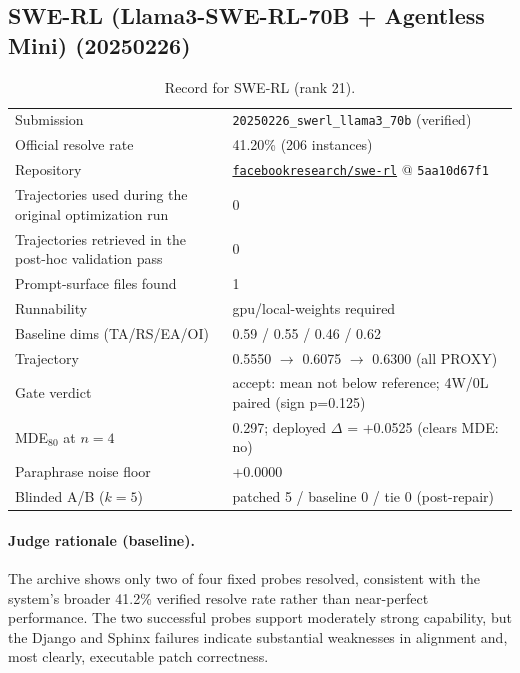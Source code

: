 \subsection{SWE-RL (Llama3-SWE-RL-70B + Agentless Mini) (20250226)}
\label{app:agent21}
\begin{table}[H]\centering\scriptsize
\caption{Record for SWE-RL (rank 21).}
\begin{tabular}{lp{8.2cm}}\toprule
Submission & \texttt{20250226\_\allowbreak{}swerl\_\allowbreak{}llama3\_\allowbreak{}70b} (verified) \\
Official resolve rate & 41.20\% (206 instances) \\
Repository & \href{https://github.com/facebookresearch/swe-rl}{\texttt{facebookresearch/swe-rl}} @ \texttt{5aa10d67f1} \\
Trajectories used during the original optimization run & 0 \\
Trajectories retrieved in the post-hoc validation pass & 0 \\
Prompt-surface files found & 1 \\
Runnability & gpu/local-weights required \\
Baseline dims (TA/RS/EA/OI) & 0.59 / 0.55 / 0.46 / 0.62 \\
Trajectory & 0.5550 $\to$ 0.6075 $\to$ 0.6300 (all PROXY) \\
Gate verdict & accept: mean not below reference; 4W/0L paired (sign p=0.125) \\
MDE$_{80}$ at $n{=}4$ & 0.297; deployed $\Delta$ = +0.0525 (clears MDE: no) \\
Paraphrase noise floor & +0.0000 \\
Blinded A/B ($k{=}5$) & patched 5 / baseline 0 / tie 0 (post-repair) \\
\bottomrule\end{tabular}\end{table}
\paragraph{Judge rationale (baseline).}
The archive shows only two of four fixed probes resolved, consistent with the system's broader 41.2\% verified resolve rate rather than near-perfect performance. The two successful probes support moderately strong capability, but the Django and Sphinx failures indicate substantial weaknesses in alignment and, most clearly, executable patch correctness.

